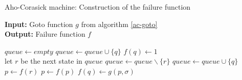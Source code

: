 \documentclass[english,twoside,censored,csm,algorithms-track-2020]{HYthesisML}
\theoremstyle{plain}
\theoremstyle{definition}
\begin{document}
  \begin{algorithm}[]

    \caption{Aho-Corasick machine: Construction of the failure function} \label{ac-fail}
    \hspace*{\algorithmicindent} \textbf{Input:} Goto function $g$ from algorithm \ref{ac-goto}\\
    \hspace*{\algorithmicindent} \textbf{Output:} Failure function $f$

    \begin{algorithmic}[1]
        \State $queue\gets \textit{empty}$
          \State $queue\gets queue \cup \{q\}$
          \State $f(q)\gets 1$
        \EndFor
        \\
          \hspace*{1.2cm plus \algorithmicindent}let $r$ be the next state in $queue$
          \State $queue\gets queue \backslash \{r\}$
            \State $queue\gets queue \cup \{q\}$
            \State $p\gets f(r)$
              \State $p\gets f(p)$
            \EndWhile
            \State $f(q)\gets g(p,\sigma)$              
          \EndFor
        \EndWhile
          
      \EndFunction

    \end{algorithmic}
  \end{algorithm}
\end{document}
